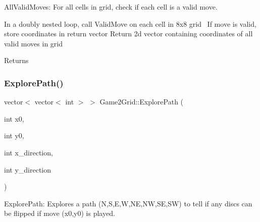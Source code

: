 All\+Valid\+Moves\+: For all cells in grid, check if each cell is a valid move. 

In a doubly nested loop, call Valid\+Move on each cell in 8x8 grid~\newline
If move is valid, store coordinates in return vector Return 2d vector containing coordinates of all valid moves in grid \begin{DoxyReturn}{Returns}

\end{DoxyReturn}
\mbox{\label{classGame2Grid_a530992f6eaed3c76ad923305cd7ae86a}} 
\subsubsection{\texorpdfstring{Explore\+Path()}{ExplorePath()}}
{\footnotesize\ttfamily vector$<$ vector$<$ int $>$ $>$ Game2\+Grid\+::\+Explore\+Path (\begin{DoxyParamCaption}\item[{int}]{x0,  }\item[{int}]{y0,  }\item[{int}]{x\+\_\+direction,  }\item[{int}]{y\+\_\+direction }\end{DoxyParamCaption})}



Explore\+Path\+: Explores a path (N,S,E,W,NE,NW,SE,SW) to tell if any discs can be flipped if move (x0,y0) is played. 


